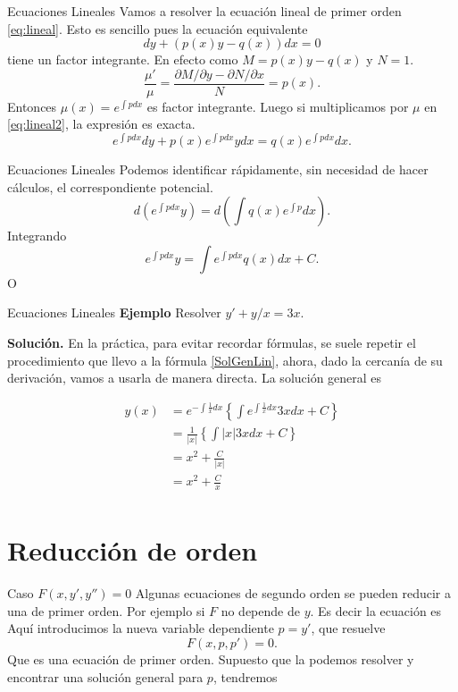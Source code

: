 \documentclass[handout,hyperref={colorlinks=true}]{beamer}
\begin{document}
\begin{frame}{Ecuaciones Lineales}
 Vamos a resolver la ecuación lineal de primer orden \eqref{eq:lineal}. Esto es sencillo pues la ecuación equivalente
 \begin{equation}\label{eq:lineal2}dy+(p(x)y-q(x))dx=0
  \end{equation}
tiene un factor integrante. En efecto como $M=p(x)y-q(x)$ y $N=1$. 
 \[\frac{\mu'}{\mu}=\frac{\partial M/\partial y-\partial N/\partial x}{N}=p(x).\]
 Entonces $\mu(x)=e^{\int pdx}$ es factor integrante. Luego si multiplicamos por $\mu$ en \eqref{eq:lineal2},  la expresión  es exacta. 
 \[e^{\int pdx}dy+p(x)e^{\int pdx}ydx=q(x)e^{\int pdx}dx.\]
\end{frame}

\begin{frame}{Ecuaciones Lineales}
Podemos identificar rápidamente, sin necesidad de hacer cálculos, el correspondiente potencial.
 \[d\left(e^{\int pdx}y\right)=d\left(\int q(x)e^{\int p} dx \right).\]
Integrando
\[e^{\int pdx}y=\int e^{\int pdx}q(x)dx+C.
 \]
 O
 
 
 
 
\end{frame}


\begin{frame}{Ecuaciones Lineales}
\textbf{Ejemplo} Resolver $y'+y/x=3x$. 

\textbf{Solución.} En la práctica, para evitar recordar fórmulas, se suele repetir el procedimiento que llevo a la fórmula \eqref{SolGenLin}, ahora, dado la cercanía
de su derivación, vamos a usarla  de manera directa. La solución general es

\[\begin{split} y(x)&=e^{-\int\frac{1}{x}dx}\left\{\int e^{\int\frac{1}{x}dx}3xdx+C\right\}\\
   &=\frac{1}{|x|}\left\{\int |x| 3xdx+C\right\}\\
   &=x^2+\frac{C}{|x|}\\
   &=x^2+\frac{C}{x}\\
  \end{split}
\]
 
\end{frame}


\section{Reducción de orden}
\begin{frame}{Caso $F(x,y',y'')=0$}
Algunas ecuaciones de segundo orden
se pueden reducir a una de primer orden. Por ejemplo si $F$ no depende de $y$. Es decir la ecuación es
Aquí introducimos la nueva variable dependiente $\boxed{p=y'}$, que resuelve
\[F(x,p,p')=0.\]
Que es una ecuación de primer orden. Supuesto que la podemos resolver y encontrar una solución general para  $p$, tendremos
 

\end{frame}
\end{document}
